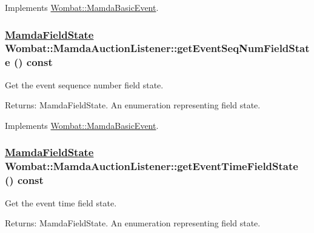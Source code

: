 Implements \hyperlink{classWombat_1_1MamdaBasicEvent_418ecb29b412cd42581b54c87b5360fd}{Wombat::Mamda\-Basic\-Event}.\hypertarget{classWombat_1_1MamdaAuctionListener_2438446343ae500da094c67160f39b66}{
\subsubsection[getEventSeqNumFieldState]{\setlength{\rightskip}{0pt plus 5cm}\hyperlink{namespaceWombat_93aac974f2ab713554fd12a1fa3b7d2a}{Mamda\-Field\-State} Wombat::Mamda\-Auction\-Listener::get\-Event\-Seq\-Num\-Field\-State () const}}
\label{classWombat_1_1MamdaAuctionListener_2438446343ae500da094c67160f39b66}


Get the event sequence number field state. 

\begin{Desc}
\item[Returns:]Mamda\-Field\-State. An enumeration representing field state. \end{Desc}


Implements \hyperlink{classWombat_1_1MamdaBasicEvent_51cc0b9d4c2b8a982ccd18b339707cb5}{Wombat::Mamda\-Basic\-Event}.\hypertarget{classWombat_1_1MamdaAuctionListener_c156f3f2735c0064ac4bafe6e6ad7eac}{
\subsubsection[getEventTimeFieldState]{\setlength{\rightskip}{0pt plus 5cm}\hyperlink{namespaceWombat_93aac974f2ab713554fd12a1fa3b7d2a}{Mamda\-Field\-State} Wombat::Mamda\-Auction\-Listener::get\-Event\-Time\-Field\-State () const}}
\label{classWombat_1_1MamdaAuctionListener_c156f3f2735c0064ac4bafe6e6ad7eac}


Get the event time field state. 

\begin{Desc}
\item[Returns:]Mamda\-Field\-State. An enumeration representing field state. \end{Desc}


